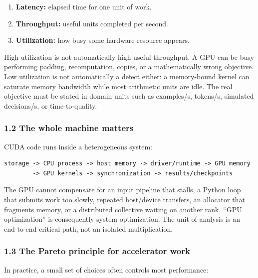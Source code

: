 \documentclass[
  10pt,
  letterpaper,
]{article}
\providecommand{\tightlist}{%
  \setlength{\itemsep}{0pt}\setlength{\parskip}{0pt}}
\begin{document}
\begin{enumerate}
\def\labelenumi{\arabic{enumi}.}
\tightlist
\item
  \textbf{Latency:} elapsed time for one unit of work.
\item
  \textbf{Throughput:} useful units completed per second.
\item
  \textbf{Utilization:} how busy some hardware resource appears.
\end{enumerate}

High utilization is not automatically high useful throughput. A GPU can
be busy performing padding, recomputation, copies, or a mathematically
wrong objective. Low utilization is not automatically a defect either: a
memory-bound kernel can saturate memory bandwidth while most arithmetic
units are idle. The real objective must be stated in domain units such
as examples/s, tokens/s, simulated decisions/s, or time-to-quality.

\subsubsection{1.2 The whole machine
matters}\label{12-the-whole-machine-matters}

CUDA code runs inside a heterogeneous system:

\begin{verbatim}
storage -> CPU process -> host memory -> driver/runtime -> GPU memory
        -> GPU kernels -> synchronization -> results/checkpoints
\end{verbatim}

The GPU cannot compensate for an input pipeline that stalls, a Python
loop that submits work too slowly, repeated host/device transfers, an
allocator that fragments memory, or a distributed collective waiting on
another rank. ``GPU optimization'' is consequently system optimization.
The unit of analysis is an end-to-end critical path, not an isolated
multiplication.

\subsubsection{1.3 The Pareto principle for accelerator
work}\label{13-the-pareto-principle-for-accelerator-work}

In practice, a small set of choices often controls most performance:
\end{document}
